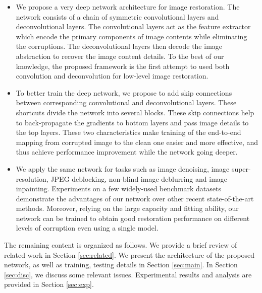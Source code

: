 \begin{itemize}
  
\item We propose a very deep network architecture for image restoration. The network consists of a
chain of symmetric convolutional layers and deconvolutional layers. The convolutional layers act as
the feature extractor which encode the primary components of image contents while eliminating the
corruptions. The deconvolutional layers then decode the image abstraction to recover the image content
details. To the best of our knowledge, the proposed framework is the first attempt to used both
convolution and deconvolution for low-level image restoration.

\item To better train the deep network, we propose to add skip connections between corresponding
convolutional and deconvolutional layers. These shortcuts divide the network into several blocks.
These skip connections help to back-propagate the gradients to bottom layers and pass image details
to the top layers. These two characteristics make training of the end-to-end mapping from corrupted image
to the clean one easier and more effective, and thus achieve performance improvement while the network going deeper.

\item We apply the same network for tasks such as image denoising, image super-resolution, JPEG
    deblocking, non-blind image deblurring and image inpainting.
Experiments on a few widely-used  benchmark datasets demonstrate the advantages of our network over
other recent state-of-the-art methods. Moreover, relying on the large capacity and fitting
ability, our network can be trained to obtain good restoration performance on different levels
of corruption even using a single model.
\end{itemize}



The remaining content
is organized as follows. We provide a brief review of related work in Section \ref{sec:related}.
We present the architecture of the proposed network, as well as training, testing details in Section \ref{sec:main}.
In Section \ref{sec:disc}, we discuss some relevant issues.
Experimental results and analysis are provided in Section \ref{sec:exp}.
